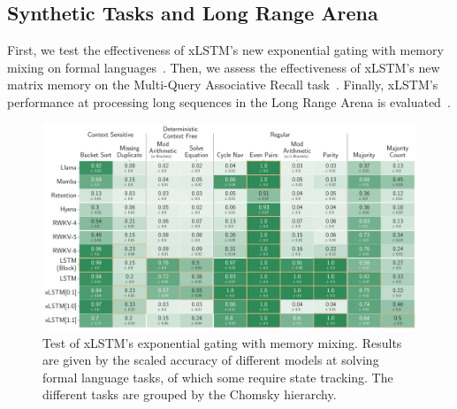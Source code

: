 \documentclass[dvipsnames]{article}
\begin{document}


\subsection{Synthetic Tasks and Long Range Arena}
\label{sec:ExpSyntethic}
First, we test the effectiveness of xLSTM's 
new exponential gating with memory mixing on 
formal languages~\citep{Deletang:23}.
Then, we assess the effectiveness of xLSTM's new matrix memory
on the Multi-Query Associative Recall task~\citep{Arora:23arxiv}.
Finally, xLSTM's performance at processing 
long sequences in the Long Range Arena is evaluated~\citep{Tay:21}.


\begin{figure}[h]
\includegraphics[width=\textwidth]{figures/Chomsky_MainPaper.pdf}
\caption{Test of xLSTM's exponential gating with memory mixing. 
   Results are given by the scaled accuracy of different models at 
   solving formal language tasks, of which some require state tracking. 
   The different tasks are grouped by 
   the Chomsky hierarchy. \label{fig:formal-main}}
\end{figure}
\end{document}
